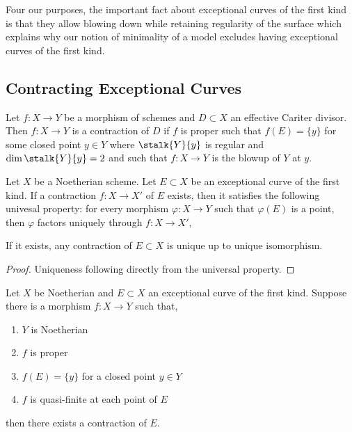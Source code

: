 \begin{rmk}
Four our purposes, the important fact about exceptional curves of the first kind is that they allow blowing down while retaining regularity of the surface which explains why our notion of minimality of a model excludes having exceptional curves of the first kind. 
\end{rmk}

\subsection{Contracting Exceptional Curves}

\begin{defn}
Let $f : X \to Y$ be a morphism of schemes and $D \subset X$ an effective Cariter divisor. Then $f : X \to Y$ is a contraction of $D$ if $f$ is proper such that $f(E) = \{ y \}$ for some closed point $y \in Y$ where $\stalk{Y}{y}$ is regular and $\dim{\stalk{Y}{y}} = 2$ and such that $f : X \to Y$ is the blowup of $Y$ at $y$. 
\end{defn}

\begin{lemma}[0C5J]
Let $X$ be a Noetherian scheme. Let $E \subset X$ be an exceptional curve of the first kind. If a contraction $f : X \to X'$ of $E$ exists, then it satisfies the following univesal property: for every morphism $\varphi : X \to Y$ such that $\varphi(E)$ is a point, then $\varphi$ factors uniquely through $f : X \to X'$,
\begin{center}
\end{center}
\end{lemma}

\begin{corollary}
If it exists, any contraction of $E \subset X$ is unique up to unique isomorphism. 
\end{corollary}

\begin{proof}
Uniqueness following directly from the universal property.
\end{proof}

\begin{prop}[Tag 0C2L] \label{existence_of_blowdown}
Let $X$ be Noetherian and $E \subset X$ an exceptional curve of the first kind. Suppose there is a morphism $f : X \to Y$ such that,
\begin{enumerate}
\item $Y$ is Noetherian
\item $f$ is proper
\item $f(E) = \{ y \}$ for a closed point $y \in Y$
\item $f$ is quasi-finite at each point of $E$
\end{enumerate}
then there exists a contraction of $E$.
\end{prop}

